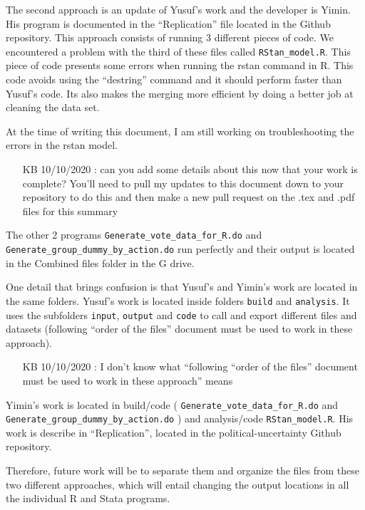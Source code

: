 \documentclass[a4paper,12pt]{article}
\begin{document}
\begin{enumerate}
The second approach is an update of Yusuf’s work and the developer is Yimin. His program is documented in the “Replication” file located in the Github repository. This approach consists of running 3 different pieces of code. We encountered a problem with the third of these files called \texttt{RStan\_model.R}. This piece of code presents some errors when running the rstan command in R.  This code avoids using the “destring” command and it should perform faster than Yusuf’s code. Its also makes the merging more efficient by doing a better job at cleaning the data set.  

At the time of writing this document, I am still working on troubleshooting the errors in the rstan model. 
\begin{itemize}
	\item [KB 10/10/2020]: can you add some details about this now that your work is complete? You'll need to pull my updates to this document down to your repository to do this and then make a new pull request on the .tex and .pdf files for this summary
\end{itemize}

The other 2 programs \texttt{Generate\_vote\_data\_for\_R.do} and \texttt{Generate\_group\_dummy\_by\_action.do} run perfectly and their output is located in the Combined files folder in the G drive. 

One detail that brings confusion is that Yusuf's and Yimin's work are located in the same folders. 
Yusuf's work is located inside folders \texttt{build} and \texttt{analysis}. It uses the subfolders \texttt{input}, \texttt{output} and \texttt{code} to call and export different files and datasets (following ``order of the files'' document must be used to work in these approach).
\begin{itemize}
	\item [KB 10/10/2020]: I don't know what ``following ``order of the files'' document must be used to work in these approach'' means
\end{itemize}
Yimin's work is located in build/code ( \texttt{Generate\_vote\_data\_for\_R.do} and \texttt{Generate\_group\_dummy\_by\_action.do} ) and analysis/code \texttt{RStan\_model.R}. His work is describe in ``Replication'', located in the political-uncertainty Github repository. 

Therefore, future work will be to separate them and organize the files from these two different approaches, which will entail changing the output locations in all the individual R and Stata programs. 




\end{enumerate}
\end{document}
